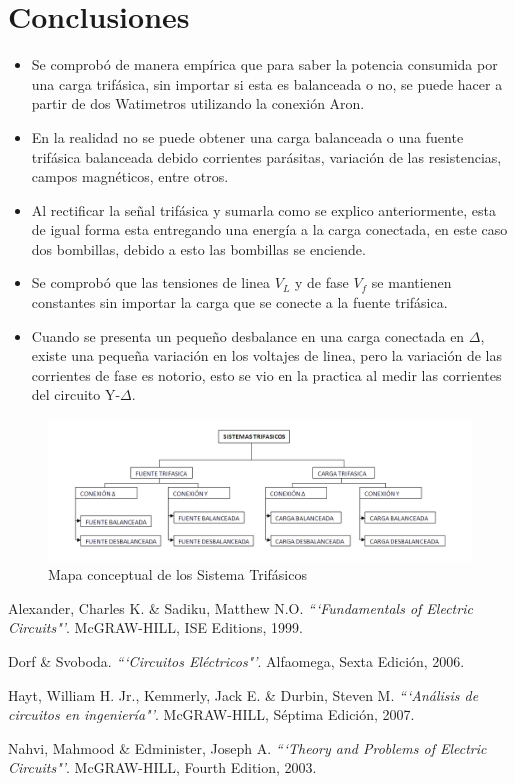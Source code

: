 \documentclass[twocolumn]{IEEEtran}
\begin{document}
\section{Conclusiones}
\begin{itemize}
 \item Se comprobó de manera empírica que para saber la potencia consumida por una carga trifásica, sin importar si esta es balanceada o no, se puede hacer a partir de dos Watimetros utilizando la conexión Aron.
 \item En la realidad no se puede obtener una carga balanceada o una fuente trifásica balanceada debido corrientes parásitas, variación de las resistencias, campos magnéticos, entre otros.
 \item Al rectificar la señal trifásica y sumarla como se explico anteriormente, esta de igual forma esta entregando una energía a la carga conectada, en este caso dos bombillas, debido a esto las bombillas se enciende.
 \item Se comprobó que las tensiones de linea $V_L$ y de fase $V_f$ se mantienen constantes sin importar la carga que se conecte a la fuente trifásica.
 \item Cuando se presenta un pequeño desbalance en una carga conectada en $\Delta$, existe una pequeña variación en los voltajes de linea, pero la variación de las corrientes de fase es notorio, esto se vio en la practica al medir las corrientes del circuito Y-$\Delta$.
\end{itemize}

\begin{figure}[H]
	\centering
		\includegraphics[scale=0.63]{mapa.png}
	\caption{Mapa conceptual de los Sistema Trifásicos}
	\label{figura12}
\end{figure}


\begin{thebibliography}{99}
 Alexander, Charles K. \&  Sadiku, Matthew N.O.
{\em ```Fundamentals of Electric Circuits"'}.
McGRAW-HILL, ISE Editions, 1999.

 Dorf  \& Svoboda.
{\em ```Circuitos Eléctricos"'}.
Alfaomega, Sexta Edición, 2006.

 Hayt, William H. Jr., Kemmerly, Jack E. \& Durbin, Steven M.
{\em ```Análisis de circuitos en ingeniería"'}.
McGRAW-HILL, Séptima Edición, 2007.

 Nahvi, Mahmood \& Edminister, Joseph A.
{\em ```Theory and Problems of Electric Circuits"'}.
McGRAW-HILL, Fourth Edition, 2003.

\end{thebibliography}
\end{document}
